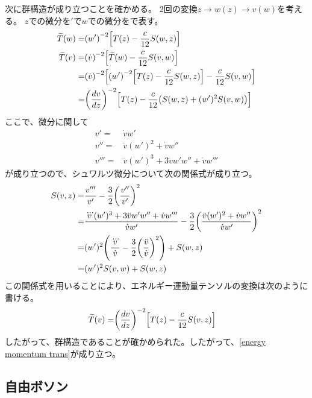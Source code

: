 \documentclass[11pt, dvipdfmx]{article}
\numberwithin{equation}{section}
\begin{document}
次に群構造が成り立つことを確かめる。
2回の変換$z\rightarrow w(z)\rightarrow v(w)$を考える。
$z$での微分を$'$で$w$での微分を$\dot{}$で表す。
\begin{align}
    \widetilde{T}(w)=&\qty(w')^{-2}\qty[T(z) - \frac{c}{12}S(w,z)]\\
    \widetilde{T}(v)=&\qty(\dot{v})^{-2}\qty[\widetilde{T}(w) - \frac{c}{12}S(v,w)]\notag\\
    =&\qty(\dot{v})^{-2}\qty[\qty(w')^{-2}\qty[T(z) - \frac{c}{12}S(w,z)] - \frac{c}{12}S(v,w)]\notag\\
    =&\qty(\frac{dv}{dz})^{-2}\qty[T(z) - \frac{c}{12}\qty(S(w,z) + (w')^2 S(v,w))]
\end{align}
ここで、微分に関して
\begin{align}
   v'=& \dot{v} w'\\
   v''=& \ddot{v}(w')^2 + \dot{v} w''\\
   v'''=& \dddot{v}(w')^3 + 3\ddot{v} w' w'' + \dot{v} w'''
\end{align}
が成り立つので、シュワルツ微分について次の関係式が成り立つ。
\begin{align}
    S(v,z)=& \frac{v'''}{v'} - \frac{3}{2}\qty(\frac{v''}{v'})^2\\
    =&\frac{ \dddot{v}(w')^3 + 3\ddot{v} w' w'' + \dot{v} w'''}{\dot{v} w'}-\frac{3}{2}\qty(\frac{\ddot{v}(w')^2 + \dot{v} w''}{\dot{v} w'})^2\\
    =& (w')^2 \qty(\frac{\dddot{v}}{\dot{v}} - \frac{3}{2}\qty(\frac{\ddot{v}}{\dot{v}})^2) + S(w,z)\\
    =& (w')^2 S(v,w) + S(w,z)
\end{align}
この関係式を用いることにより、エネルギー運動量テンソルの変換は次のように書ける。
\begin{align}
    \widetilde{T}(v)=&\qty(\frac{dv}{dz})^{-2}\qty[T(z) - \frac{c}{12}S(v,z)]
\end{align}
したがって、群構造であることが確かめられた。したがって、\eqref{energy momentum trans}が成り立つ。
\subsection{自由ボソン}
\end{document}

